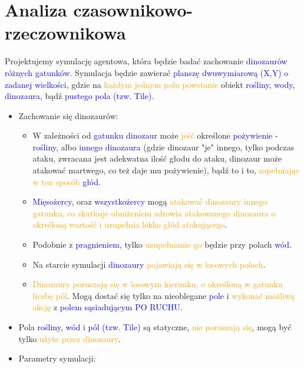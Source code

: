 \section{Analiza czasownikowo-rzeczownikowa}
Projektujemy symulację agentowa, która będzie badać zachowanie \textcolor{blue}{dinozaurów} \textcolor{blue}{różnych gatunków}. Symulacja będzie zawierać \textcolor{blue}{planszę dwuwymiarową (X,Y) o zadanej wielkości}, gdzie na \textcolor{orange}{każdym jednym polu powstanie} obiekt \textcolor{blue}{rośliny}, \textcolor{blue}{wody}, \textcolor{blue}{dinozaura}, bądź \textcolor{blue}{pustego pola (tzw. Tile)}.
\begin{itemize}
    \item Zachowanie się dinozaurów:
    \begin{itemize}
        \item W zależności od \textcolor{blue}{gatunku dinozaur} może \textcolor{orange}{jeść} określone \textcolor{blue}{pożywienie} - \textcolor{blue}{rośliny}, albo \textcolor{blue}{innego dinozaura} (gdzie dinozaur "je" innego, tylko podczas ataku, zwracana jest adekwatna ilość głodu do ataku, dinozaur może atakować martwego, co też daje mu pożywienie), bądź to i to, \textcolor{orange}{zapełniając w ten sposób} \textcolor{blue}{głód}.
        \item \textcolor{blue}{Mięsożercy}, oraz \textcolor{blue}{wszystkożercy} mogą \textcolor{orange}{atakować dinozaury innego gatunku, co skutkuje obniżeniem zdrowia atakowanego dinozaura o określoną wartość i uzupełnia lekko głód atakującego}.
        \item Podobnie z \textcolor{blue}{pragnieniem}, tylko \textcolor{orange}{uzupełnianie go} będzie przy polach \textcolor{blue}{wód}.
        \item Na starcie symulacji \textcolor{blue}{dinozaury} \textcolor{orange}{pojawiają się w losowych polach}.
        \item \textcolor{orange}{Dinozaury poruszają się w losowym kierunku, o określoną w gatunku liczbę pól}. Mogą dostać się tylko na nieoblegane \textcolor{blue}{pole} i \textcolor{orange}{wykonać możliwą akcję} z \textcolor{blue}{polem sąsiadującym PO RUCHU}.
    \end{itemize}
    \item Pola \textcolor{blue}{rośliny}, \textcolor{blue}{wód} i \textcolor{blue}{pól (tzw. Tile)} są statyczne, \textcolor{orange}{nie poruszają się}, mogą być tylko \textcolor{orange}{użyte przez dinozaury}.
    \item Parametry symulacji:

\end{itemize}
